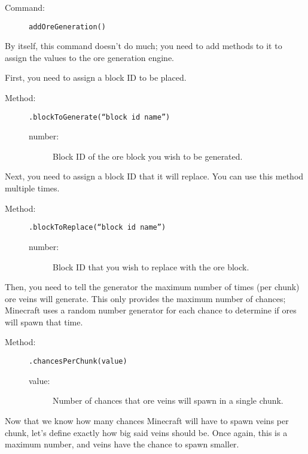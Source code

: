 \documentclass[letterpaper,titlepage,12pt]{article}
\begin{document}
\begin{description}
\begin{description}
\item[Command:] \texttt{addOreGeneration()}
\end{description}

By itself, this command doesn't do much; you need to add methods to it to assign the values to the ore generation engine.

First, you need to assign a block ID to be placed.

\begin{description}
\item[Method:] \texttt{.blockToGenerate(``block id name'')}
\begin{description}
\item [number:] Block ID of the ore block you wish to be generated.
\end{description}
\end{description}

Next, you need to assign a block ID that it will replace.  You can use this method multiple times.

\begin{description}
\item[Method:] \texttt{.blockToReplace(``block id name'')}
\begin{description}
\item [number:] Block ID that you wish to replace with the ore block.
\end{description}
\end{description}

Then, you need to tell the generator the maximum number of times (per chunk) ore veins will generate.  This only provides the maximum number of chances; Minecraft uses a random number generator for each chance to determine if ores will spawn that time.

\begin{description}
\item[Method:] \texttt{.chancesPerChunk(value)}
\begin{description}
\item [value:] Number of chances that ore veins will spawn in a single chunk.
\end{description}
\end{description}

Now that we know how many chances Minecraft will have to spawn veins per chunk, let's define exactly how big said veins should be.  Once again, this is a maximum number, and veins have the chance to spawn smaller.


\end{description}
\end{document}
